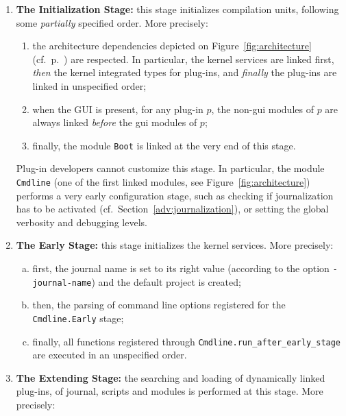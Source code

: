 \begin{enumerate}[A --]

\item \textbf{The Initialization Stage:} this stage
  initializes \framac compilation units, following some \emph{partially}
  specified order. More precisely:
  \begin{enumerate}[1.]
  \item the architecture dependencies depicted on
    Figure~\ref{fig:architecture} (cf.~p.~\pageref{archi:general}) are
    respected. In particular, the kernel services are linked first,
    \emph{then} the kernel integrated types for plug-ins, and
    \emph{finally} the plug-ins are linked in unspecified order;
  \item when the GUI is present, for any plug-in
    $p$, the non-gui modules of $p$ are always linked \emph{before}
    the gui modules of $p$;
  \item finally, the module \texttt{Boot} is linked at the
    very end of this stage.
  \end{enumerate}

  Plug-in developers cannot customize this stage. In particular, the module
  \texttt{Cmdline} (one of the first linked modules, see
  Figure~\ref{fig:architecture}) performs a very early configuration stage,
  such as checking if journalization has to be activated
  (cf.~Section~\ref{adv:journalization}), or setting the
  global verbosity and debugging levels.

\item \label{stage:early} \textbf{The Early Stage:} this stage initializes the
  kernel services. More precisely:
  \begin{enumerate}[(a)]
  \item first, the journal name is set to its right value (according to the
    option \texttt{-journal-name}) and the default project is created;
  \item then, the parsing of command line options registered for the
    \texttt{Cmdline.Early} stage;
  \item finally, all functions registered through
    \texttt{Cmdline.run\_after\_early\_stage}%
     are executed in an
    unspecified order.
  \end{enumerate}

\item \label{stage:extending} \textbf{The Extending Stage:} the searching and
  loading of dynamically linked plug-ins, of journal, scripts and
  modules is performed at this stage. More precisely:


\end{enumerate}
